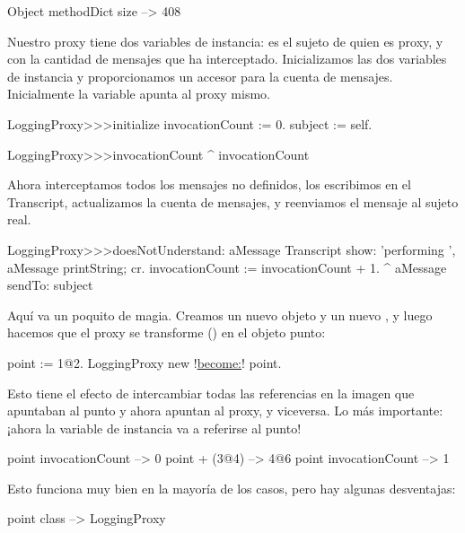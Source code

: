 \documentclass[a4paper,10pt,twoside]{book}
\begin{document}
\begin{code}{}
Object methodDict size --> 408
\end{code}

Nuestro proxy tiene dos variables de instancia:  es el
sujeto de quien es proxy, y  con la cantidad de mensajes que
ha interceptado.  Inicializamos las dos variables de instancia y
proporcionamos un accesor para la cuenta de mensajes.  Inicialmente la
variable  apunta al proxy mismo.
\begin{code}{}
LoggingProxy>>>initialize
        invocationCount := 0.
        subject := self.
\end{code}

\begin{code}{}
LoggingProxy>>>invocationCount
        ^ invocationCount
\end{code}

Ahora interceptamos todos los mensajes no definidos, los escribimos en
el Transcript, actualizamos la cuenta de mensajes, y reenviamos el
mensaje al sujeto real.
\begin{code}{}
LoggingProxy>>>doesNotUnderstand: aMessage
        Transcript show: 'performing ', aMessage printString; cr.
        invocationCount := invocationCount + 1.
        ^ aMessage sendTo: subject
\end{code}

Aquí va un poquito de magia.  Creamos un nuevo objeto  y un
nuevo , y luego hacemos que el proxy se transforme
() en el objeto punto:
\begin{code}{}
point := 1@2.
LoggingProxy new !\underline{become:}! point.
\end{code}

Esto tiene el efecto de intercambiar todas las referencias en la
imagen que apuntaban al punto y ahora apuntan al proxy, y viceversa.
Lo más importante: ¡ahora la variable de instancia  va a
referirse al punto!

\begin{code}{}
point invocationCount --> 0
point + (3@4)             --> 4@6
point invocationCount --> 1
\end{code}

Esto funciona muy bien en la mayoría de los casos, pero hay algunas
desventajas: 
\begin{code}{}
point class --> LoggingProxy
\end{code}
\end{document}
